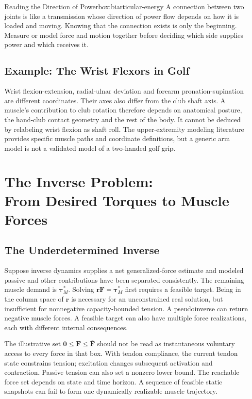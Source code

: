 \begin{laymansbox}{Reading the Direction of Power}{box:biarticular-energy}
A connection between two joints is like a transmission whose direction of power flow depends on how it is loaded and moving. Knowing that the connection exists is only the beginning. Measure or model force and motion together before deciding which side supplies power and which receives it.
\end{laymansbox}

\subsection{Example: The Wrist Flexors in Golf}

Wrist flexion-extension, radial-ulnar deviation and forearm pronation-supination are different coordinates. Their axes also differ from the club shaft axis. A muscle's contribution to club rotation therefore depends on anatomical posture, the hand-club contact geometry and the rest of the body. It cannot be deduced by relabeling wrist flexion as shaft roll. The upper-extremity modeling literature provides specific muscle paths and coordinate definitions, but a generic arm model is not a validated model of a two-handed golf grip. \citep{Holzbaur2005}

\section[The Inverse Problem: From Desired Torques to Muscle Forces]{The Inverse Problem:\\From Desired Torques to Muscle Forces}
\label{sec:inverse-problem}

\subsection{The Underdetermined Inverse}

Suppose inverse dynamics supplies a net generalized-force estimate and modeled passive and other contributions have been separated consistently. The remaining muscle demand is $\bm\tau_M^*$. Solving $\bm r\bm F=\bm\tau_M^*$ first requires a feasible target. Being in the column space of $\bm r$ is necessary for an unconstrained real solution, but insufficient for nonnegative capacity-bounded tension. A pseudoinverse can return negative muscle forces. A feasible target can also have multiple force realizations, each with different internal consequences.

The illustrative set $\bm0\leq\bm F\leq\overline{\bm F}$ should not be read as instantaneous voluntary access to every force in that box. With tendon compliance, the current tendon state constrains tension; excitation changes subsequent activation and contraction. Passive tension can also set a nonzero lower bound. The reachable force set depends on state and time horizon. A sequence of feasible static snapshots can fail to form one dynamically realizable muscle trajectory.

